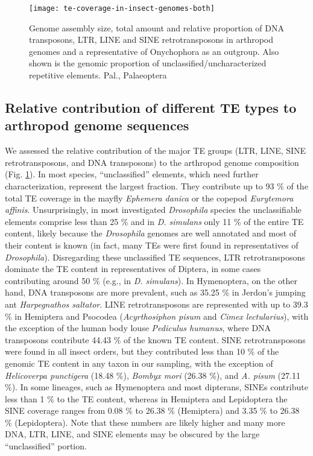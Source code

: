 \begin{figure}[h!]
\begin{center}
\texttt{[image: te-coverage-in-insect-genomes-both]}
\caption[Arthropod genome size and TE coverage]{{Genome assembly size,
total amount and relative proportion of DNA transposons, LTR, LINE and
SINE retrotransposons in arthropod genomes and a representative of
Onychophora as an outgroup. Also shown is the genomic proportion of
unclassified/uncharacterized repetitive elements.  Pal., Palaeoptera%
\label{fig:te-coverage}
}}
\end{center}
\end{figure}

\subsection{Relative contribution of different TE types to arthropod genome sequences}

We assessed the relative contribution of the major TE groups (LTR, LINE,
SINE retrotransposons, and DNA transposons) to the arthropod genome
composition (Fig. \ref{fig:te-coverage}). In most species,
``unclassified'' elements, which need further characterization,
represent the largest fraction. They contribute up to 93 \% of the total
TE coverage in the mayfly \emph{Ephemera danica} or the copepod
\emph{Eurytemora affinis}.  Unsurprisingly, in most investigated
\emph{Drosophila} species the unclassifiable elements comprise less than
25 \% and in \emph{D.  simulans} only 11 \% of the entire TE content,
likely because the \emph{Drosophila} genomes are well annotated and most
of their content is known (in fact, many TEs were first found in
representatives of \emph{Drosophila}). Disregarding these unclassified
TE sequences, LTR retrotransposons dominate the TE content in
representatives of Diptera, in some cases contributing around 50 \%
(e.g., in \emph{D. simulans}).  In Hymenoptera, on the other hand, DNA
transposons are more prevalent, such as 35.25 \% in Jerdon's jumping ant
\emph{Harpegnathos saltator}.  LINE retrotransposons are represented
with up to 39.3 \% in Hemiptera and Psocodea (\emph{Acyrthosiphon pisum}
and \emph{Cimex lectularius}), with the exception of the human body
louse \emph{Pediculus humanus}, where DNA transposons contribute 44.43
\% of the known TE content. SINE retrotransposons were found in all
insect orders, but they contributed less than 10 \% of the genomic TE
content in any taxon in our sampling, with the exception of
\emph{Helicoverpa punctigera} (18.48 \%), \emph{Bombyx mori} (26.38 \%),
and \emph{A. pisum} (27.11 \%). In some lineages, such as Hymenoptera
and most dipterans, SINEs contribute less than 1 \% to the TE content,
whereas in Hemiptera and Lepidoptera the SINE coverage ranges from 0.08
\% to 26.38 \% (Hemiptera) and 3.35 \% to 26.38 \% (Lepidoptera). Note
that these numbers are likely higher and many more DNA, LTR, LINE, and
SINE elements may be obscured by the large ``unclassified'' portion.

